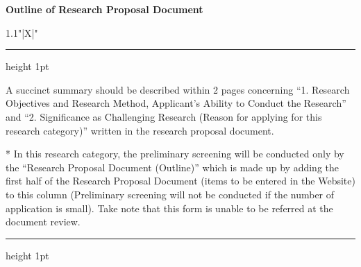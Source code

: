 \documentclass[8pt]{extarticle}
\makeatletter
\newcommand{\thickhline}{%
	\noalign {\ifnum 0=`}\fi \hrule height 1pt
	\futurelet \reserved@a \@xhline
}
\makeatother
\begin{document}
	
\noindent\textbf{\fontsize{12}{12}\selectfont Outline of Research Proposal Document}\\
\begin{tabularx}{1.1\linewidth}{"|X|"}
	\thickhline
	A succinct summary should be described within 2 pages concerning ``1. Research Objectives and Research Method, Applicant's Ability to Conduct the Research'' and ``2. Significance as Challenging Research (Reason for applying for this research category)'' written in the research proposal document.
	
	* In this research category, the preliminary screening will be conducted only by the ``Research Proposal Document (Outline)'' which is made up by adding the first half of the Research Proposal Document (items to be entered in the Website) to this column (Preliminary screening will not be conducted if the number of application is small). Take note that this form is unable to be referred at the document review.
	\\
	\thickhline
\end{tabularx}
\end{document}
